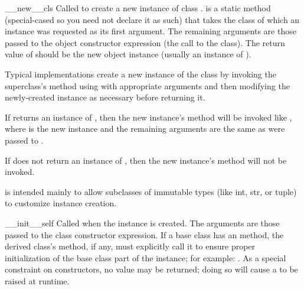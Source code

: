 \begin{methoddesc}[object]{__new__}{cls\optional{, \moreargs}}
Called to create a new instance of class .  
is a static method (special-cased so you need not declare it as such)
that takes the class of which an instance was requested as its first
argument.  The remaining arguments are those passed to the object
constructor expression (the call to the class).  The return value of
 should be the new object instance (usually an
instance of ).

Typical implementations create a new instance of the class by invoking
the superclass's  method using
with appropriate arguments and then modifying the newly-created instance
as necessary before returning it.

If  returns an instance of , then the new
instance's  method will be invoked like
, where  is the new instance
and the remaining arguments are the same as were passed to
.

If  does not return an instance of , then the
new instance's  method will not be invoked.

 is intended mainly to allow subclasses of
immutable types (like int, str, or tuple) to customize instance
creation.
\end{methoddesc}

\begin{methoddesc}[object]{__init__}{self\optional{, \moreargs}}
Called when the instance is created.  The
arguments are those passed to the class constructor expression.  If a
base class has an  method, the derived class's
 method, if any, must explicitly call it to ensure proper
initialization of the base class part of the instance; for example:
.  As a special
constraint on constructors, no value may be returned; doing so will
cause a  to be raised at runtime.
\end{methoddesc}


